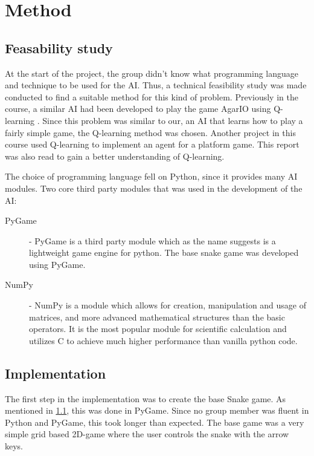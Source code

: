 \documentclass[fleqn,10pt]{SelfArx} %
\begin{document}
\section{Method} \label{sec:method}

\subsection{Feasability study} \label{subsec:feasabilityStudy}
At the start of the project, the group didn't know what programming language and technique to be used for the AI. Thus, a technical feasibility study was made conducted to find a suitable method for this kind of problem. Previously in the course, a similar AI had been developed to play the game AgarIO using Q-learning \cite{AgarIO}. Since this problem was similar to our, an AI that learns how to play a fairly simple game, the Q-learning method was chosen. Another project in this course used Q-learning to implement an agent for a platform game. This report \cite{platformgame} was also read to gain a better understanding of Q-learning.

The choice of programming language fell on Python, since it provides many AI modules. Two core third party modules that was used in the development of the AI:
\begin{description}
\item[PyGame \cite{pygame}] - PyGame is a third party module  which as the name suggests is a lightweight game engine for python. The base snake game was developed using PyGame.
\item[NumPy \cite{numpy}] - NumPy is a module which allows for creation, manipulation and usage of matrices, and more advanced mathematical structures than the basic operators. It is the most popular module for scientific calculation and utilizes C to achieve much higher performance than vanilla python code. 
\end{description}

\subsection{Implementation}
The first step in the implementation was to create the base Snake game. As mentioned in \ref{subsec:feasabilityStudy}, this was done in PyGame. Since no group member was fluent in Python and PyGame, this took longer than expected. The base game was a very simple grid based 2D-game where the user controls the snake with the arrow keys.
\end{document}

